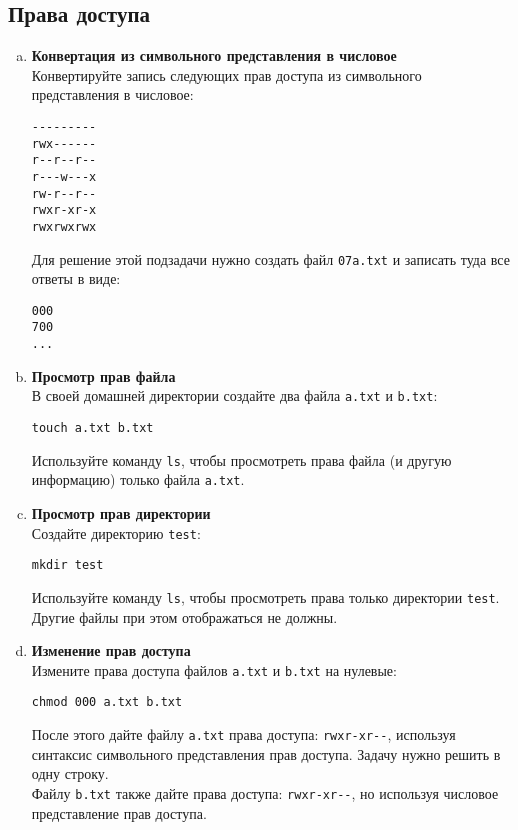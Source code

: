 \documentclass{article}
\begin{document}
\subsection{Права доступа}
\begin{enumerate}[a.]
\item \textbf{Конвертация из символьного представления в числовое}\\
Конвертируйте запись следующих прав доступа из символьного представления в числовое:
\begin{lstlisting}
---------
rwx------
r--r--r--
r---w---x
rw-r--r--
rwxr-xr-x
rwxrwxrwx
\end{lstlisting}
Для решение этой подзадачи нужно создать файл \texttt{07a.txt} и записать туда все ответы в виде:
\begin{lstlisting}
000
700
...
\end{lstlisting}

\item \textbf{Просмотр прав файла}\\
В своей домашней директории создайте два файла \texttt{a.txt} и \texttt{b.txt}:
\begin{lstlisting}
touch a.txt b.txt
\end{lstlisting}
Используйте команду \texttt{ls}, чтобы просмотреть права файла (и другую информацию) только файла \texttt{a.txt}.

\item \textbf{Просмотр прав директории}\\
Создайте директорию \texttt{test}:
\begin{lstlisting}
mkdir test
\end{lstlisting}
Используйте команду \texttt{ls}, чтобы просмотреть права только директории \texttt{test}. Другие файлы при этом отображаться не должны.


\item \textbf{Изменение прав доступа}\\
Измените права доступа файлов \texttt{a.txt} и \texttt{b.txt} на нулевые:
\begin{lstlisting}
chmod 000 a.txt b.txt
\end{lstlisting}
После этого дайте файлу \texttt{a.txt} права доступа: \texttt{rwxr-xr-{}-}, используя синтаксис символьного представления прав доступа. Задачу нужно решить в одну строку.\\
Файлу \texttt{b.txt} также дайте права доступа: \texttt{rwxr-xr-{}-}, но используя числовое представление прав доступа. 


\end{enumerate}
\end{document}
